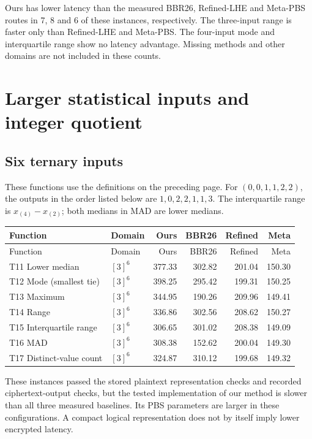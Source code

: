 \documentclass[a4paper,10pt]{article}
\begin{document}
Ours has lower latency than the measured BBR26, Refined-LHE and Meta-PBS routes in 7, 8 and 6 of these instances, respectively. The three-input range is faster only than Refined-LHE and Meta-PBS. The four-input mode and interquartile range show no latency advantage. Missing methods and other domains are not included in these counts.

\newpage
\section{Larger statistical inputs and integer quotient}
\subsection{Six ternary inputs}
These functions use the definitions on the preceding page. For $(0,0,1,1,2,2)$, the outputs in the order listed below are $1,0,2,2,1,1,3$. The interquartile range is $x_{(4)}-x_{(2)}$; both medians in MAD are lower medians.

\begin{longtable}{@{}p{56mm}lrrrr@{}}
\toprule
Function & Domain & Ours & BBR26 & Refined & Meta\\\midrule
\endfirsthead
\toprule
Function & Domain & Ours & BBR26 & Refined & Meta\\\midrule
\endhead
T11 Lower median & $[3]^{6}$ & 377.33 & 302.82 & 201.04 & 150.30\\
T12 Mode (smallest tie) & $[3]^{6}$ & 398.25 & 295.42 & 199.31 & 150.25\\
T13 Maximum & $[3]^{6}$ & 344.95 & 190.26 & 209.96 & 149.41\\
T14 Range & $[3]^{6}$ & 336.86 & 302.56 & 208.62 & 150.27\\
T15 Interquartile range & $[3]^{6}$ & 306.65 & 301.02 & 208.38 & 149.09\\
T16 MAD & $[3]^{6}$ & 308.38 & 152.62 & 200.04 & 149.30\\
T17 Distinct-value count & $[3]^{6}$ & 324.87 & 310.12 & 199.68 & 149.32\\
\bottomrule\end{longtable}

These instances passed the stored plaintext representation checks and recorded ciphertext-output checks, but the tested implementation of our method is slower than all three measured baselines. Its PBS parameters are larger in these configurations. A compact logical representation does not by itself imply lower encrypted latency.
\end{document}
